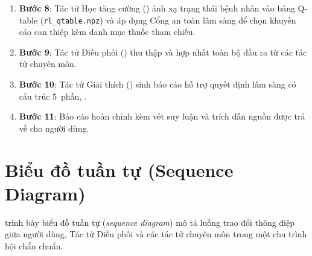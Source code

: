 \begin{enumerate}
  \item \textbf{Bước 8}: Tác tử Học tăng cường () ánh xạ trạng thái bệnh nhân vào bảng Q-table (\texttt{rl\_qtable.npz}) và áp dụng Cổng an toàn lâm sàng để chọn khuyến cáo can thiệp kèm danh mục thuốc tham chiếu.
  \item \textbf{Bước 9}: Tác tử Điều phối () thu thập và hợp nhất toàn bộ đầu ra từ các tác tử chuyên môn.
  \item \textbf{Bước 10}: Tác tử Giải thích () sinh báo cáo hỗ trợ quyết định lâm sàng có cấu trúc 5~phần, .
  \item \textbf{Bước 11}: Báo cáo hoàn chỉnh kèm vết suy luận và trích dẫn nguồn được trả về cho người dùng.
\end{enumerate}

\section{Biểu đồ tuần tự (Sequence Diagram)}
\label{sec:sequence-diagram}

 trình bày biểu đồ tuần tự (\emph{sequence diagram}) mô tả luồng trao đổi thông điệp giữa người dùng, Tác tử Điều phối và các tác tử chuyên môn trong một chu trình hội chẩn chuẩn.

